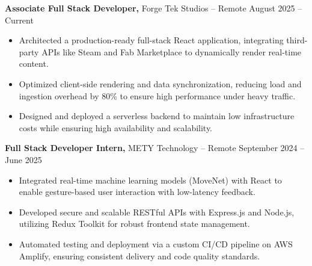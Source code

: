 \documentclass[11pt]{article}       %
\begin{document}
\textbf{Associate Full Stack Developer,} {Forge Tek Studios} -- Remote \hfill August 2025 -- Current 
\vspace{-9pt}
\begin{itemize}
  \item Architected a production-ready full-stack React application, integrating third-party APIs like Steam and Fab Marketplace to dynamically render real-time content.
  \item Optimized client-side rendering and data synchronization, reducing load and ingestion overhead by 80\% to ensure high performance under heavy traffic.
  \item Designed and deployed a serverless backend to maintain low infrastructure costs while ensuring high availability and scalability.
\end{itemize}

\textbf{Full Stack Developer Intern,} {METY Technology} -- Remote \hfill September 2024 -- June 2025 
\vspace{-9pt}
\begin{itemize}
  \item Integrated real-time machine learning models (MoveNet) with React to enable gesture-based user interaction with low-latency feedback.
  \item Developed secure and scalable RESTful APIs with Express.js and Node.js, utilizing Redux Toolkit for robust frontend state management.
  \item Automated testing and deployment via a custom CI/CD pipeline on AWS Amplify, ensuring consistent delivery and code quality standards.
\end{itemize}

\end{document}
